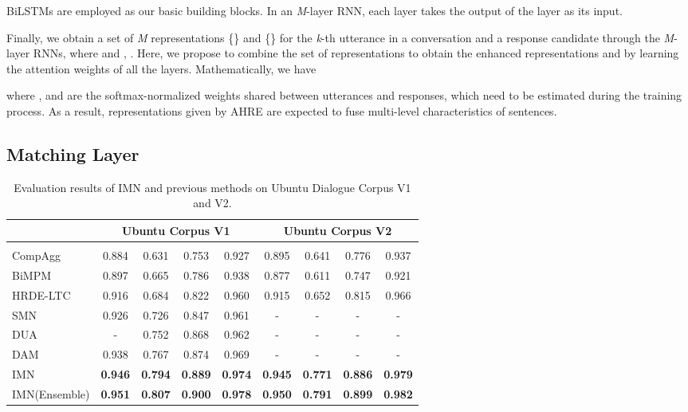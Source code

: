 \documentclass[sigconf]{acmart}
\begin{document}
    BiLSTMs \cite{DBLP:journals/neco/HochreiterS97} are employed as our basic building blocks. In an \emph{M}-layer RNN, each  layer takes the output of the  layer as its input.

    Finally, we obtain a set of \emph{M} representations \{\} and \{\} for the \emph{k}-th utterance in a conversation and a response candidate through the \emph{M}-layer RNNs, where  and , .
Here, we propose to combine the set of representations to obtain the enhanced representations  and  by learning the attention weights of all the layers. Mathematically, we have

    where ,  and  are the softmax-normalized weights shared between utterances and responses, which need to be estimated during the training process. As a result, representations given by AHRE are expected to fuse multi-level characteristics of sentences.

  \subsection{Matching Layer}

    \begin{table*}[!hbt]
     \small
     \caption{Evaluation results of IMN and previous methods on Ubuntu Dialogue Corpus V1 and  V2.}
     \centering
     \begin{tabular}{l|c|c|c|c|c|c|c|c}
      \toprule
                             & \multicolumn{4}{c|}{Ubuntu Corpus V1} & \multicolumn{4}{c}{Ubuntu Corpus V2} \\
      \hline
                             &  &  &  &  &  &  &  & \\
      \hline


CompAgg \cite{DBLP:journals/corr/WangJ16b}         & 0.884 & 0.631 & 0.753 & 0.927 & 0.895 & 0.641 & 0.776 & 0.937 \\
       BiMPM \cite{DBLP:conf/ijcai/WangHF17}              & 0.897 & 0.665 & 0.786 & 0.938 & 0.877 & 0.611 & 0.747 & 0.921 \\
       HRDE-LTC \cite{DBLP:conf/naacl/YoonSJ18}           & 0.916 & 0.684 & 0.822 & 0.960 & 0.915 & 0.652 & 0.815 & 0.966 \\
       SMN \cite{DBLP:conf/acl/WuWXZL17}                  & 0.926 & 0.726 & 0.847 & 0.961 & -     & -     & -     & -     \\
       DUA \cite{DBLP:conf/coling/ZhangLZZL18}            & -     & 0.752 & 0.868 & 0.962 & -     & -     & -     & -     \\
       DAM \cite{DBLP:conf/acl/WuLCZDYZL18}               & 0.938 & 0.767 & 0.874 & 0.969 & -     & -     & -     & -     \\
      \hline
       IMN                  & \textbf{0.946} & \textbf{0.794} & \textbf{0.889} & \textbf{0.974} & \textbf{0.945} & \textbf{0.771} & \textbf{0.886} & \textbf{0.979} \\
       IMN(Ensemble)        & \textbf{0.951} & \textbf{0.807} & \textbf{0.900} & \textbf{0.978} & \textbf{0.950} & \textbf{0.791} & \textbf{0.899} & \textbf{0.982}  \\
      \bottomrule
      \end{tabular}
      \label{tab2}
    \end{table*}
\end{document}
